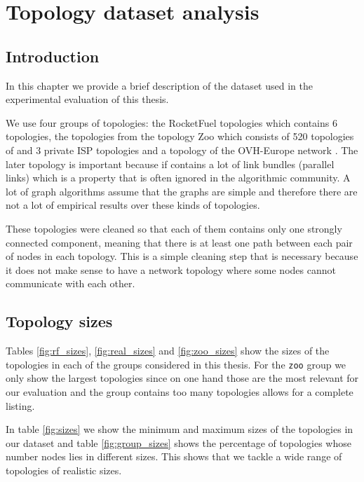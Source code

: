 \chapter{Topology dataset analysis}
\label{chapter:dataset}

\section*{Introduction}

In this chapter we provide a brief description of the dataset used in the experimental evaluation of this thesis.

We use four groups of topologies: the RocketFuel topologies \cite{rocketfuel} which contains 6 topologies, the topologies from the
topology Zoo \cite{internetzoo-jsac11} which consists of 520 topologies of and 3 private ISP topologies and a topology of the
OVH-Europe network \cite{OVH}. The later topology is important because if contains a lot of link bundles (parallel links) which is a 
property that is often ignored in the algorithmic community. A lot of graph algorithms assume that the graphs are simple
and therefore there are not a lot of empirical results over these kinds of topologies.

These topologies were cleaned so that each of them contains only one strongly connected component, meaning
that there is at least one path between each pair of nodes in each topology. This is a simple cleaning step that is necessary because
it does not make sense to have a network topology where some nodes cannot communicate with each other.

\section{Topology sizes}

Tables \ref{fig:rf_sizes}, \ref{fig:real_sizes} and \ref{fig:zoo_sizes} show the sizes of the topologies in each
of the groups considered in this thesis. For the \texttt{zoo} group we only show the largest topologies since on one
hand those are the most relevant for our evaluation and the group contains too many topologies allows for a complete
listing.

In table \ref{fig:sizes} we show the
minimum and maximum sizes of the topologies in our dataset and table \ref{fig:group_sizes} shows the percentage of topologies whose
number nodes lies in different sizes. This shows that we tackle a wide range
of topologies of realistic sizes. 

